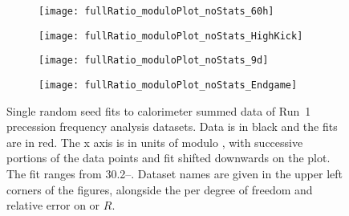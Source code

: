 \begin{figure}
\centering
    \begin{subfigure}[]{0.45\textwidth}
        \centering
        \texttt{[image: fullRatio\_moduloPlot\_noStats\_60h]}
    \end{subfigure}%
    \begin{subfigure}[]{0.45\textwidth}
        \centering
        \texttt{[image: fullRatio\_moduloPlot\_noStats\_HighKick]}
    \end{subfigure}
    \vspace{4mm}
    \begin{subfigure}[]{0.45\textwidth}
        \centering
        \texttt{[image: fullRatio\_moduloPlot\_noStats\_9d]}
    \end{subfigure}%
    \begin{subfigure}[]{0.45\textwidth}
        \centering
        \texttt{[image: fullRatio\_moduloPlot\_noStats\_Endgame]}
    \end{subfigure}
\caption[Single random seed fits to calorimeter summed data of Run~1 precession frequency analysis datasets]{Single random seed fits to calorimeter summed data of Run~1 precession frequency analysis datasets. Data is in black and the fits are in red. The x axis is in units of \mus{} modulo , with successive portions of the data points and fit shifted downwards on the plot. The fit ranges from 30.2--. Dataset names are given in the upper left corners of the figures, alongside the \chisq per degree of freedom and relative error on \wa or $R$.}
\label{fig:moduloPlots}
\end{figure}



